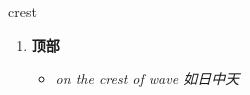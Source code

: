 
\begin{frame}
{\huge crest}
\begin{center}
\begin{enumerate}\Large
  \item \textbf{顶部}
  \begin{itemize}
    \item \em{\Large{on the crest of wave 如日中天}}
  \end{itemize}
\end{enumerate}
\end{center}
\end{frame}
